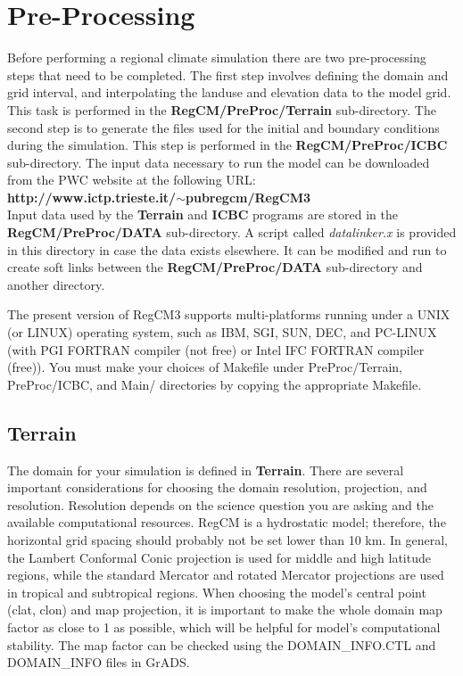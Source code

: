 \newpage
\section{Pre-Processing}
Before performing a regional climate simulation there are two pre-processing steps that need to be completed.  The first step involves defining the domain and grid interval, and interpolating the landuse and elevation data to the model grid.  This task is performed in the {\bf RegCM/PreProc/Terrain} sub-directory. The second step is to generate the files used for the initial and boundary conditions during the simulation. This step is performed in the {\bf RegCM/PreProc/ICBC} sub-directory.  The input data necessary to run the model can be downloaded from the PWC 
website at the following URL: \\

{\bf http://www.ictp.trieste.it/$\sim$pubregcm/RegCM3} \\

Input data used by the {\bf Terrain} and {\bf ICBC}  programs are 
stored in the {\bf RegCM/PreProc/DATA} sub-directory.  A script called
{\it datalinker.x} is provided in this directory in case the data 
exists elsewhere.  It can be modified and run to create soft links 
between the {\bf RegCM/PreProc/DATA} sub-directory and another directory.

The present version of RegCM3 supports multi-platforms running under a UNIX (or LINUX) operating
system, such as IBM, SGI, SUN, DEC, and PC-LINUX (with PGI FORTRAN compiler (not free) or
Intel IFC FORTRAN compiler (free)). You must make your choices of Makefile under 
PreProc/Terrain, PreProc/ICBC, and Main/ directories by copying the appropriate
Makefile. 

\subsection{Terrain}

The domain for your simulation is defined in {\bf Terrain}. There are several important considerations for choosing the domain
resolution, projection, and resolution. Resolution depends on the
science question you are asking and the available computational
resources. RegCM is a hydrostatic model; therefore, the horizontal grid
spacing should probably not be set lower than 10 km. In general, the
Lambert Conformal Conic projection is used for middle and high latitude
regions, while the standard Mercator and rotated Mercator projections
are used in tropical and subtropical regions.  When choosing the model's central point (clat, clon) and map projection, it is important to
make the whole domain map factor as close to 1 as possible, which will be helpful for model's computational stability. The map factor can be checked using the DOMAIN\_INFO.CTL and DOMAIN\_INFO files in GrADS.

